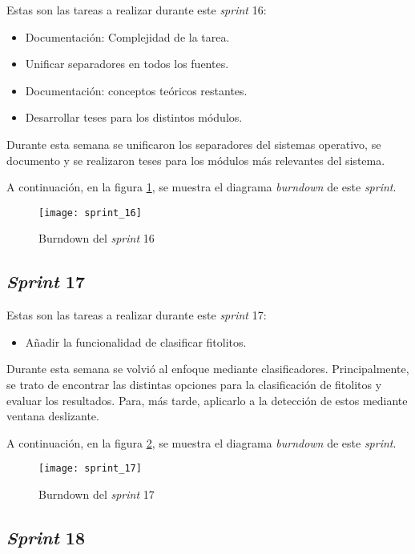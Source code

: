 Estas son las tareas a realizar durante este \textit{sprint} 16:

\begin{itemize}
	\item Documentación: Complejidad de la tarea.
	\item Unificar separadores en todos los fuentes.
	\item Documentación: conceptos teóricos restantes.
	\item Desarrollar teses para los distintos módulos.
\end{itemize}

Durante esta semana se unificaron los separadores del sistemas operativo, se documento y se realizaron teses para los módulos más relevantes del sistema.

A continuación, en la figura \ref{fig:A.1.17}, se muestra el diagrama \textit{burndown} de este \textit{sprint}.

\begin{figure}
\centering
\texttt{[image: sprint\_16]}
\caption{Burndown del \textit{sprint} 16}
\label{fig:A.1.17}
\end{figure}

\subsection{\textit{Sprint} 17}

Estas son las tareas a realizar durante este \textit{sprint} 17:

\begin{itemize}
	\item Añadir la funcionalidad de clasificar fitolitos.
\end{itemize}

Durante esta semana se volvió al enfoque mediante clasificadores. Principalmente, se trato de encontrar las distintas opciones para la clasificación de fitolitos y evaluar los resultados. Para, más tarde, aplicarlo a la detección de estos mediante ventana deslizante.

A continuación, en la figura \ref{fig:A.1.18}, se muestra el diagrama \textit{burndown} de este \textit{sprint}.

\begin{figure}
\centering
\texttt{[image: sprint\_17]}
\caption{Burndown del \textit{sprint} 17}
\label{fig:A.1.18}
\end{figure}

\subsection{\textit{Sprint} 18}

